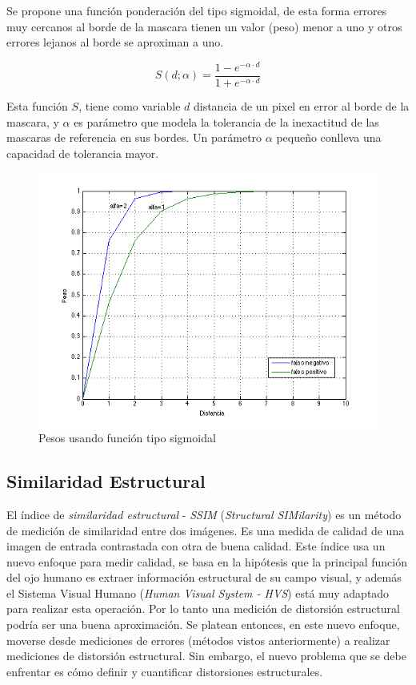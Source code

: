 Se propone una función ponderación del tipo sigmoidal, de esta forma errores muy cercanos al borde de la mascara tienen un valor (peso) menor a uno y otros errores lejanos al borde se aproximan a uno. 

\begin{equation}
S(d;\alpha) = \frac{1 - e^{-\alpha \cdot d}}{1 + e^{-\alpha \cdot d}}
\end{equation}

Esta función $S$, tiene como variable $d$ distancia de un pixel en error al borde de la mascara, y $\alpha$ es parámetro que modela la tolerancia de la inexactitud de las mascaras de referencia en sus bordes. Un parámetro $\alpha$ pequeño conlleva una capacidad de tolerancia mayor. 

\begin{figure}[!ht]
\centering
\includegraphics[scale=0.4]{img/ch4/sigmoid_function}
\caption{Pesos usando función tipo sigmoidal}
\label{fig:Pesos tipo sigmoidal}
\end{figure}


\subsection{Similaridad Estructural}
El índice de \emph{similaridad estructural} - \emph{SSIM} (\emph{Structural SIMilarity}) \cite{park_benchmark_2013} \cite{wang_image_2004} es un método de medición de similaridad entre dos imágenes. Es una medida de calidad de una imagen de entrada contrastada con otra de buena calidad. Este índice usa un nuevo enfoque para medir calidad, se basa en la hipótesis que la principal función del ojo humano  es extraer información estructural de su campo visual, y además el Sistema Visual Humano (\emph{Human Visual System - HVS}) está muy adaptado para realizar esta operación. Por lo tanto una medición de distorsión estructural podría ser una buena aproximación. Se platean entonces, en este nuevo enfoque, moverse desde mediciones de errores (métodos vistos anteriormente) a realizar mediciones de distorsión estructural. Sin embargo, el nuevo problema que se debe enfrentar es cómo definir y cuantificar distorsiones estructurales.

